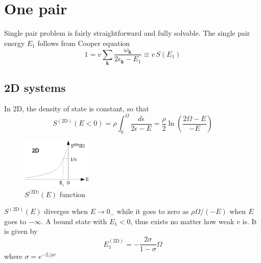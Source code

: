 \documentclass{article}
\newcommand{\vk}{\ensuremath{\mathbf{k}}}
\newcommand{\td}{{\ensuremath{{\text{(2D)}}}}}
\begin{document}
\section{One pair\label{sec:onePair}}
Single pair problem is fairly straightforward and fully solvable.  The single pair energy $E_1$ follows from Cooper equation
\begin{equation}
1=v\sum_{\vk}\frac{\omega_\vk}{2\epsilon_\vk-E_1}\equiv{}v\,S(E_1)
\label{eq:onePair}
\end{equation}
\subsection{2D systems}
In 2D, the density of state is constant, so that 
\begin{equation}
S^{(\text{2D})}(E<0)=\rho\int_0^{\Omega}\frac{d\epsilon}{2\epsilon-E}=\frac{\rho}{2}\ln\left(\frac{2\Omega-E}{-E}\right)
\label{eq:}
\end{equation}
\begin{figure}[htbp]
	\centering
		\includegraphics[width=0.30\textwidth]{2dOnePair.eps}
	\caption{$S^\td(E)$ function}
	\label{fig:2dOnePair}
\end{figure}

$S^{(\text{2D})}(E)$ diverges when $E\rightarrow{}0_{-}$ while it goes to zero as $\rho\Omega/(-E)$ when $E$ goes to $-\infty$. A bound state with $E_1<0$, thus exists no matter how weak $v$ is. It is given by 
\begin{equation}
E_1^{(\text{2D})}=-\frac{2\sigma}{1-\sigma}\Omega
\label{eq:}
\end{equation}
where $\sigma=e^{-2/\rho{v}}$
\end{document}
